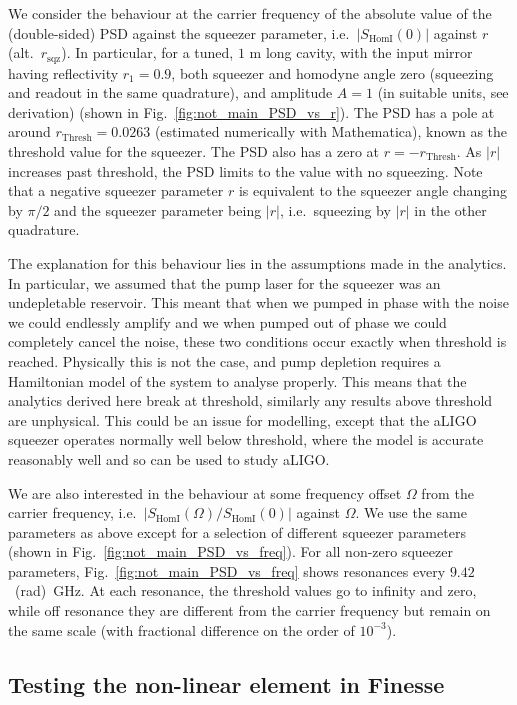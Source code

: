 \documentclass[aps,pra,superscriptaddress,reprint,nofootinbib]{revtex4-1}
\newcommand{\abs}[1]{\left\lvert #1 \right\rvert}
\begin{document}
We consider the behaviour at the carrier frequency of the absolute value of the (double-sided) PSD against the squeezer parameter, i.e.\ $\abs{S_{\mathrm{HomI}}(0)}$ against $r$ (alt.\ $r_\mathrm{sqz}$). In particular, for a tuned, $1$ m long cavity, with the input mirror having reflectivity $r_1 = 0.9$, both squeezer and homodyne angle zero (squeezing and readout in the same quadrature), and amplitude $A = 1$ (in suitable units, see derivation) (shown in Fig.~\ref{fig:not_main_PSD_vs_r}). The PSD has a pole at around $r_\mathrm{Thresh} = 0.0263$ (estimated numerically with Mathematica), known as the threshold value for the squeezer. The PSD also has a zero at $r = -r_\mathrm{Thresh}$. As $\abs{r}$ increases past threshold, the PSD limits to the value with no squeezing. Note that a negative squeezer parameter $r$ is equivalent to the squeezer angle changing by $\pi/2$ and the squeezer parameter being $\abs{r}$, i.e.\ squeezing by $\abs{r}$ in the other quadrature.


The explanation for this behaviour lies in the assumptions made in the analytics. In particular, we assumed that the pump laser for the squeezer was an undepletable reservoir. This meant that when we pumped in phase with the noise we could endlessly amplify and we when pumped out of phase we could completely cancel the noise, these two conditions occur exactly when threshold is reached. Physically this is not the case, and pump depletion requires a Hamiltonian model of the system to analyse properly. This means that the analytics derived here break at threshold, similarly any results above threshold are unphysical.
This could be an issue for modelling, except that the aLIGO squeezer operates normally well below threshold, where the model is  accurate reasonably well and so can be used to study aLIGO.


We are also interested in the behaviour at some frequency offset $\Omega$ from the carrier frequency, i.e.\ $\abs{S_{\mathrm{HomI}}(\Omega)/S_{\mathrm{HomI}}(0)}$ against $\Omega$. We use the same parameters as above except for a selection of different squeezer parameters (shown in Fig.~\ref{fig:not_main_PSD_vs_freq}). For all non-zero squeezer parameters, Fig.~\ref{fig:not_main_PSD_vs_freq} shows resonances every $9.42$~(rad)~GHz. At each resonance, the threshold values go to infinity and zero, while off resonance they are different from the carrier frequency but remain on the same scale (with fractional difference on the order of $10^{-3}$).


\subsection{Testing the non-linear element in Finesse}
\end{document}
